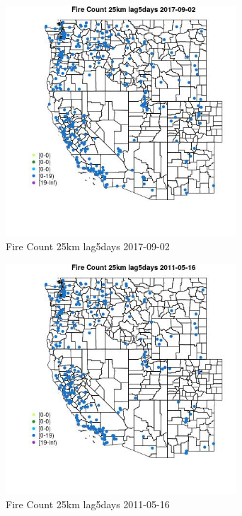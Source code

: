 \begin{figure} 
\centering  
\includegraphics[width=0.77\textwidth]{Code_Outputs/Report_ML_input_PM25_Step4_part_e_de_duplicated_aves_compiled_2019-05-21wNAs_MapObsFire_Count_25km_lag5days2017-09-02.jpg} 
\caption{\label{fig:Report_ML_input_PM25_Step4_part_e_de_duplicated_aves_compiled_2019-05-21wNAsMapObsFire_Count_25km_lag5days2017-09-02}Fire Count 25km lag5days 2017-09-02} 
\end{figure} 
 

\clearpage 

\begin{figure} 
\centering  
\includegraphics[width=0.77\textwidth]{Code_Outputs/Report_ML_input_PM25_Step4_part_e_de_duplicated_aves_compiled_2019-05-21wNAs_MapObsFire_Count_25km_lag5days2011-05-16.jpg} 
\caption{\label{fig:Report_ML_input_PM25_Step4_part_e_de_duplicated_aves_compiled_2019-05-21wNAsMapObsFire_Count_25km_lag5days2011-05-16}Fire Count 25km lag5days 2011-05-16} 
\end{figure} 
 

